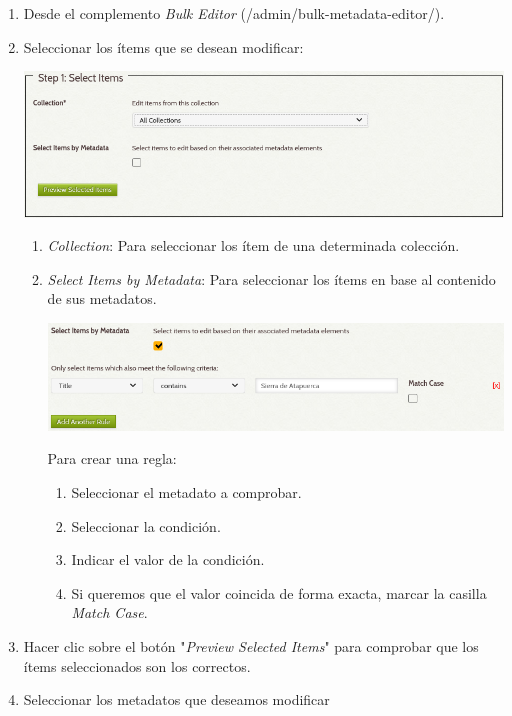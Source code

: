 \documentclass[
]{article}
\providecommand{\tightlist}{%
  \setlength{\itemsep}{0pt}\setlength{\parskip}{0pt}}
\begin{document}
\begin{enumerate}
\def\labelenumi{\arabic{enumi}.}
\item
  Desde el complemento \emph{Bulk Editor}
  ({/admin/bulk-metadata-editor/}).
\item
  Seleccionar los ítems que se desean modificar:

  \includegraphics{../_static/images/be-1.png}

  \begin{enumerate}
  \def\labelenumii{\alph{enumii}.}
  \item
    \emph{Collection}: Para seleccionar los ítem de una determinada
    colección.
  \item
    \emph{Select Items by Metadata}: Para seleccionar los ítems en base
    al contenido de sus metadatos.

    \includegraphics{../_static/images/be-1-1.png}

    Para crear una regla:

    \begin{enumerate}
    \def\labelenumiii{\arabic{enumiii}.}
    \tightlist
    \item
      Seleccionar el metadato a comprobar.
    \item
      Seleccionar la condición.
    \item
      Indicar el valor de la condición.
    \item
      Si queremos que el valor coincida de forma exacta, marcar la
      casilla \emph{Match Case}.
    \end{enumerate}
  \end{enumerate}
\item
  Hacer clic sobre el botón "\emph{Preview Selected Items}" para
  comprobar que los ítems seleccionados son los correctos.
\item
  Seleccionar los metadatos que deseamos modificar


\end{enumerate}
\end{document}
